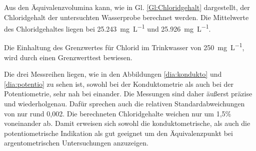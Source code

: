 Aus den Äquivalenzvolumina kann, wie in Gl. \eqref{Gl:Chloridgehalt} dargestellt, der Chloridgehalt der untersuchten Wasserprobe berechnet werden. Die Mittelwerte des Chloridgehaltes liegen bei \SI{25,243}{\milli\gram\per\liter} und \SI{25,926}{\milli\gram\per\liter}. 




Die Einhaltung des Grenzwertes für Chlorid im Trinkwasser von \SI{250}{\milli\gram\per\liter}, wird durch einen Grenzwerttest bewiesen. 








Die drei Messreihen liegen, wie in den Abbildungen \ref{dia:kondukto} und \ref{dia:potentio} zu sehen ist, sowohl bei der Konduktometrie als auch bei der Potentiometrie, sehr nah bei einander. Die Messungen sind daher äußerst präzise und wiederholgenau. Dafür sprechen auch die relativen Standardabweichungen von nur rund 0,002. Die berechneten Chloridgehalte weichen nur um 1,5\% voneinander ab. 
Damit erweisen sich sowohl die konduktometrische, als auch die potentiometrische Indikation als gut geeignet um den Äquivalenzpunkt bei argentometrischen Untersuchungen anzuzeigen.

